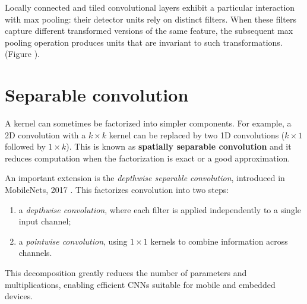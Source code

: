 Locally connected and tiled convolutional layers exhibit a particular interaction with max pooling: their detector units rely on distinct filters. When these filters capture different transformed versions of the same feature, the subsequent max pooling operation produces units that are invariant to such transformations. (Figure ).  

\section{Separable convolution}

A kernel can sometimes be factorized into simpler components.  
For example, a 2D convolution with a $k \times k$ kernel can be replaced by two 1D convolutions ($k \times 1$ followed by $1 \times k$).  
This is known as \textbf{spatially separable convolution} and it reduces computation when the factorization is exact or a good approximation.  

\clearpage

An important extension is the \textit{depthwise separable convolution}, introduced in MobileNets, 2017 \cite{howard2017mobilenets}.  
This factorizes convolution into two steps:  
\begin{enumerate}
    \item a \textit{depthwise convolution}, where each filter is applied independently to a single input channel;  
    \item a \textit{pointwise convolution}, using $1 \times 1$ kernels to combine information across channels.  
\end{enumerate}
This decomposition greatly reduces the number of parameters and multiplications, enabling efficient CNNs suitable for mobile and embedded devices.